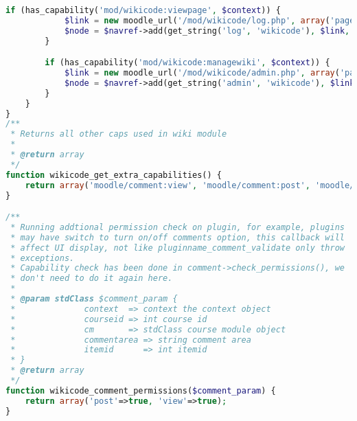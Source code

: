 \begin{lstlisting}[language=PHP]
		if (has_capability('mod/wikicode:viewpage', $context)) {
            $link = new moodle_url('/mod/wikicode/log.php', array('pageid' => $pageid));
            $node = $navref->add(get_string('log', 'wikicode'), $link, navigation_node::TYPE_SETTING);
        }

        if (has_capability('mod/wikicode:managewiki', $context)) {
            $link = new moodle_url('/mod/wikicode/admin.php', array('pageid' => $pageid));
            $node = $navref->add(get_string('admin', 'wikicode'), $link, navigation_node::TYPE_SETTING);
        }
    }
}
/**
 * Returns all other caps used in wiki module
 *
 * @return array
 */
function wikicode_get_extra_capabilities() {
    return array('moodle/comment:view', 'moodle/comment:post', 'moodle/comment:delete');
}

/**
 * Running addtional permission check on plugin, for example, plugins
 * may have switch to turn on/off comments option, this callback will
 * affect UI display, not like pluginname_comment_validate only throw
 * exceptions.
 * Capability check has been done in comment->check_permissions(), we
 * don't need to do it again here.
 *
 * @param stdClass $comment_param {
 *              context  => context the context object
 *              courseid => int course id
 *              cm       => stdClass course module object
 *              commentarea => string comment area
 *              itemid      => int itemid
 * }
 * @return array
 */
function wikicode_comment_permissions($comment_param) {
    return array('post'=>true, 'view'=>true);
}


\end{lstlisting}
